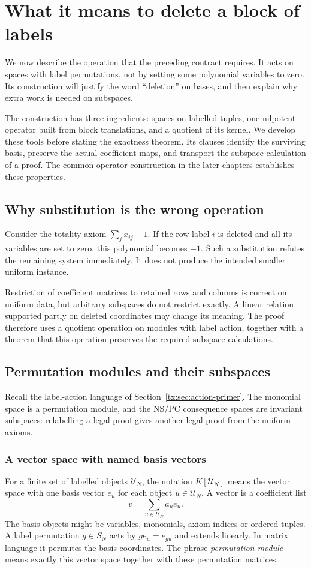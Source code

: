 \chapter{What it means to delete a block of labels}
\label{tx:chap:deletion}\label{tx:sec:transfer}
We now describe the operation that the preceding contract requires.
It acts on spaces with label permutations, not by setting some polynomial
variables to zero. Its construction will justify the word ``deletion''
on bases, and then explain why extra work is needed on subspaces.

The construction has three ingredients: spaces on labelled tuples,
one nilpotent operator built from block translations, and a quotient
of its kernel. We develop these tools before stating the exactness
theorem. Its clauses identify the surviving basis, preserve the
actual coefficient maps, and transport the subspace calculation
of a proof. The common-operator construction in the later chapters
establishes these properties.

\section{Why substitution is the wrong operation}
Consider the totality axiom $\sum_jx_{ij}-1$. If the row label $i$ is
deleted and all its variables are set to zero, this polynomial becomes
$-1$. Such a substitution refutes the remaining system immediately.
It does not produce the intended smaller uniform instance.

Restriction of coefficient matrices to retained rows and columns is
correct on uniform data, but arbitrary subspaces do not restrict exactly.
A linear relation supported partly on deleted coordinates may change its
meaning. The proof therefore uses a quotient operation on modules with
label action, together with a theorem that this operation preserves the
required subspace calculations.

\section{Permutation modules and their subspaces}
Recall the label-action language of Section~\ref{tx:sec:action-primer}.
The monomial space is a permutation module, and the NS/PC consequence
spaces are invariant subspaces: relabelling a legal proof gives another
legal proof from the uniform axioms.

\subsection*{A vector space with named basis vectors}
For a finite set of labelled objects $\mathcal U_N$, the notation
$K[\mathcal U_N]$ means the vector space with one basis vector $e_u$
for each object $u\in\mathcal U_N$. A vector is a coefficient list
\[
                         v=\sum_{u\in\mathcal U_N}a_u e_u.
\]
The basis objects might be variables, monomials, axiom indices or
ordered tuples. A label permutation $g\in S_N$ acts by
$g e_u=e_{g u}$ and extends linearly. In matrix language it permutes
the basis coordinates. The phrase \emph{permutation module} means
exactly this vector space together with these permutation matrices.

